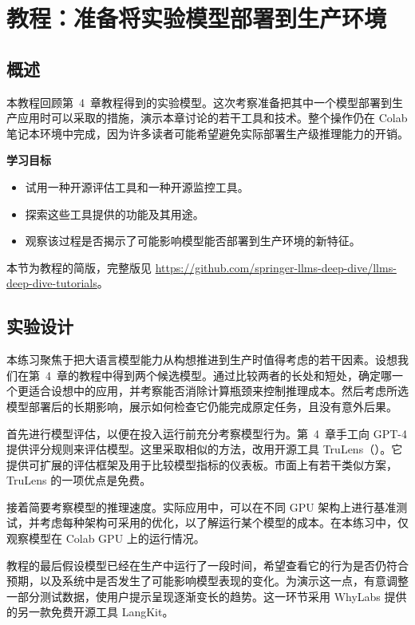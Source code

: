 \section{教程：准备将实验模型部署到生产环境}
\label{sec:ch08-tutorial}

\subsection{概述}
本教程回顾第~4~章教程得到的实验模型。这次考察准备把其中一个模型部署到生产应用时可以采取的措施，演示本章讨论的若干工具和技术。整个操作仍在 Colab 笔记本环境中完成，因为许多读者可能希望避免实际部署生产级推理能力的开销。

\begin{keypoint}
\textbf{学习目标}
\begin{itemize}
\item 试用一种开源评估工具和一种开源监控工具。
\item 探索这些工具提供的功能及其用途。
\item 观察该过程是否揭示了可能影响模型能否部署到生产环境的新特征。
\end{itemize}
\end{keypoint}

本节为教程的简版，完整版见
\url{https://github.com/springer-llms-deep-dive/llms-deep-dive-tutorials}。

\subsection{实验设计}
本练习聚焦于把大语言模型能力从构想推进到生产时值得考虑的若干因素。设想我们在第~4~章的教程中得到两个候选模型。通过比较两者的长处和短处，确定哪一个更适合设想中的应用，并考察能否消除计算瓶颈来控制推理成本。然后考虑所选模型部署后的长期影响，展示如何检查它仍能完成原定任务，且没有意外后果。

首先进行模型评估，以便在投入运行前充分考察模型行为。第~4~章手工向 GPT-4 提供评分规则来评估模型。这里采取相似的方法，改用开源工具 TruLens（）。它提供可扩展的评估框架及用于比较模型指标的仪表板。市面上有若干类似方案，TruLens 的一项优点是免费。

接着简要考察模型的推理速度。实际应用中，可以在不同 GPU 架构上进行基准测试，并考虑每种架构可采用的优化，以了解运行某个模型的成本。在本练习中，仅观察模型在 Colab GPU 上的运行情况。

教程的最后假设模型已经在生产中运行了一段时间，希望查看它的行为是否仍符合预期，以及系统中是否发生了可能影响模型表现的变化。为演示这一点，有意调整一部分测试数据，使用户提示呈现逐渐变长的趋势。这一环节采用 WhyLabs 提供的另一款免费开源工具 LangKit。

